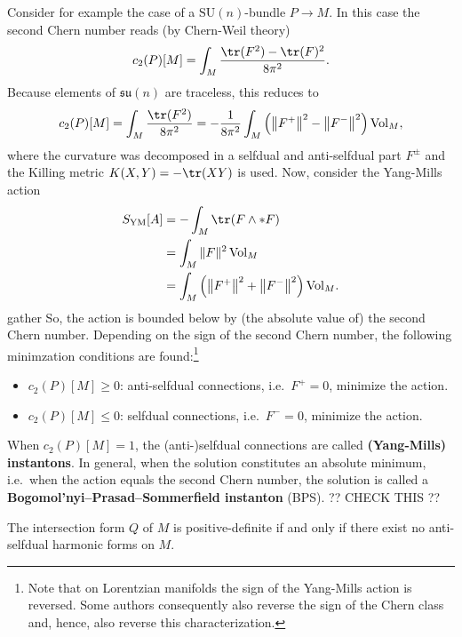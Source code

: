     Consider for example the case of a $\mathrm{SU}(n)$-bundle $P\rightarrow M$. In this case the second Chern number reads (by Chern-Weil theory)
    \begin{gather}
        c_2(P)[M] = \int_M\frac{\tr(F^2)-\tr(F)^2}{8\pi^2}.
    \end{gather}
    Because elements of $\mathfrak{su}(n)$ are traceless, this reduces to
    \begin{gather}
        c_2(P)[M] = \int_M\frac{\tr(F^2)}{8\pi^2}=-\frac{1}{8\pi^2}\int_M\left(\left\|F^+\right\|^2-\left\|F^-\right\|^2\right)\mathrm{Vol}_M,
    \end{gather}
    where the curvature was decomposed in a selfdual and anti-selfdual part $F^\pm$ and the Killing metric $K(X,Y)=-\tr(XY)$ is used. Now, consider the Yang-Mills action
    \begin{align*}
        S_\mathrm{YM}[A] &= -\int_M\tr(F\wedge\ast F)\\
        &= \int_M\|F\|^2\,\mathrm{Vol}_M\\
        &= \int_M\left(\left\|F^+\right\|^2+\left\|F^-\right\|^2\right)\mathrm{Vol}_M.
    \end{align*}{gather}
    So, the action is bounded below by (the absolute value of) the second Chern number. Depending on the sign of the second Chern number, the following minimzation conditions are found:\footnote{Note that on Lorentzian manifolds the sign of the Yang-Mills action is reversed. Some authors consequently also reverse the sign of the Chern class and, hence, also reverse this characterization.}
    \begin{itemize}
        \item $c_2(P)[M]\geq0$: anti-selfdual connections, i.e.~$F^+=0$, minimize the action.
        \item $c_2(P)[M]\leq0$: selfdual connections, i.e.~$F^-=0$, minimize the action.
    \end{itemize}
    When $c_2(P)[M]=1$, the (anti-)selfdual connections are called \textbf{(Yang-Mills) instantons}. In general, when the solution constitutes an absolute minimum, i.e.~when the action equals the second Chern number, the solution is called a \textbf{Bogomol'nyi–Prasad–Sommerfield instanton} (BPS).  ?? CHECK THIS ??

    \begin{property}
        The intersection form $Q$ of $M$ is positive-definite if and only if there exist no anti-selfdual harmonic forms on $M$.
    \end{property}

